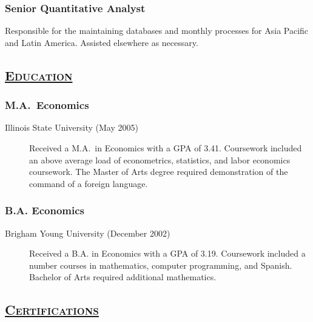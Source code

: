 \documentclass[
  letterpaper,
  DIV=11,
  numbers=noendperiod]{scrartcl}
\begin{document}
\hypertarget{senior-quantitative-analyst}{%
\subsubsection{Senior Quantitative
Analyst}\label{senior-quantitative-analyst}}

Responsible for the maintaining databases and monthly processes for Asia
Pacific and Latin America. Assisted elsewhere as necessary.

\hypertarget{education}{%
\subsection{\texorpdfstring{\textsc{\uline{Education}}}{Education}}\label{education}}

\hypertarget{m.a.-economics}{%
\subsubsection{M.A.~Economics}\label{m.a.-economics}}

\begin{description}
\item[Illinois State University (May 2005)]
Received a M.A.~in Economics with a GPA of 3.41. Coursework included an
above average load of econometrics, statistics, and labor economics
coursework. The Master of Arts degree required demonstration of the
command of a foreign language.
\end{description}

\hypertarget{b.a.-economics}{%
\subsubsection{B.A. Economics}\label{b.a.-economics}}

\begin{description}
\item[Brigham Young University (December 2002)]
Received a B.A. in Economics with a GPA of 3.19. Coursework included a
number courses in mathematics, computer programming, and Spanish.
Bachelor of Arts required additional mathematics.
\end{description}

\hypertarget{certifications}{%
\subsection{\texorpdfstring{\textsc{\uline{Certifications}}}{Certifications}}\label{certifications}}
\end{document}
